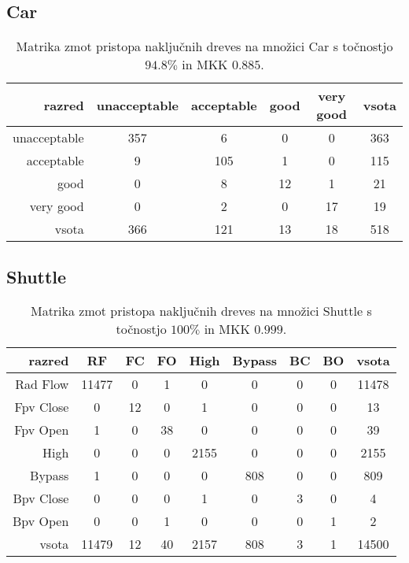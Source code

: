 \subsection{Car}\label{subsec:random-forest-car-test}
\begin{table}[H]
    \centering
    \begin{tabular}{||rccccc||}
        \hline
        razred       & unacceptable & acceptable & good & very good & vsota \\ \hline
        unacceptable & 357          & 6          & 0    & 0         & 363   \\ \hline
        acceptable   & 9            & 105        & 1    & 0         & 115   \\ \hline
        good         & 0            & 8          & 12   & 1         & 21    \\ \hline
        very good    & 0            & 2          & 0    & 17        & 19    \\ \hline
        vsota        & 366          & 121        & 13   & 18        & 518   \\ \hline
    \end{tabular}
    \caption{Matrika zmot pristopa naključnih dreves na množici Car s točnostjo $94.8\%$ in MKK $0.885$.}
    \label{tab:rforest_car_cm}
\end{table}

\subsection{Shuttle}\label{subsec:random-forest-shuttle-test}
\begin{table}[H]
    \centering
    \begin{tabular}{||rcccccccc||}
        \hline
        razred    & RF    & FC & FO & High & Bypass & BC & BO & vsota \\ \hline
        Rad Flow  & 11477 & 0  & 1  & 0    & 0      & 0  & 0  & 11478 \\ \hline
        Fpv Close & 0     & 12 & 0  & 1    & 0      & 0  & 0  & 13    \\ \hline
        Fpv Open  & 1     & 0  & 38 & 0    & 0      & 0  & 0  & 39    \\ \hline
        High      & 0     & 0  & 0  & 2155 & 0      & 0  & 0  & 2155  \\ \hline
        Bypass    & 1     & 0  & 0  & 0    & 808    & 0  & 0  & 809   \\ \hline
        Bpv Close & 0     & 0  & 0  & 1    & 0      & 3  & 0  & 4     \\ \hline
        Bpv Open  & 0     & 0  & 1  & 0    & 0      & 0  & 1  & 2     \\ \hline
        vsota     & 11479 & 12 & 40 & 2157 & 808    & 3  & 1  & 14500 \\ \hline
    \end{tabular}
    \caption{Matrika zmot pristopa naključnih dreves na množici Shuttle s točnostjo $100\%$ in MKK $0.999$.}
    \label{tab:rforest_shuttle_cm}
\end{table}